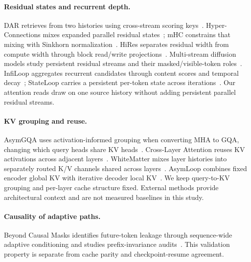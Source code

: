 \documentclass[11pt,letterpaper]{article}
\begin{document}
\paragraph{Residual states and recurrent depth.}
DAR retrieves from two histories using cross-stream scoring
keys~\cite{dar2026}. %
Hyper-Connections mixes expanded parallel residual
states~\cite{hc2024}; %
mHC constrains that mixing with Sinkhorn
normalization~\cite{mhc2026}. %
HiRes separates residual width from compute width through block read/write
projections~\cite{hires2026}. %
Multi-stream diffusion models study persistent residual streams and their
masked/visible-token roles~\cite{diffusionstreams2026}. %
InfiLoop aggregates recurrent candidates through content scores and temporal
decay~\cite{infiloop2026}; %
StateLoop carries a persistent per-token state across
iterations~\cite{stateloop2026}. %
Our attention reads draw on one source history without adding persistent
parallel residual streams.

\paragraph{KV grouping and reuse.}
AsymGQA uses activation-informed grouping when converting MHA to GQA,
changing which query heads share KV heads~\cite{asymgqa2024}. %
Cross-Layer Attention reuses KV activations across adjacent
layers~\cite{cla2024}. %
WhiteMatter mixes layer histories into separately routed K/V channels
shared across layers~\cite{whitematter2026}. %
AsymLoop combines fixed encoder global KV with iterative decoder local
KV~\cite{asymloop2026}. %
We keep query-to-KV grouping and per-layer cache structure fixed.
External methods provide architectural context and are not measured
baselines in this study.

\paragraph{Causality of adaptive paths.}
Beyond Causal Masks identifies future-token leakage through sequence-wide
adaptive conditioning and studies prefix-invariance
audits~\cite{causalaudit2026}. %
This validation property is separate from cache parity and checkpoint-resume
agreement.
\end{document}
